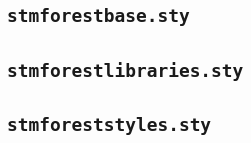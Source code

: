 \documentclass[%
  type=article,%
  layout=koma,%
  date=true,%
  hyperref=true,%
  listings=true,%
  forest=false,%
]{stmtext}
\begin{document}


\subsection{\protect\texttt{stmforestbase.sty}}



\subsection{\protect\texttt{stmforestlibraries.sty}}



\subsection{\protect\texttt{stmforeststyles.sty}}


\end{document}
